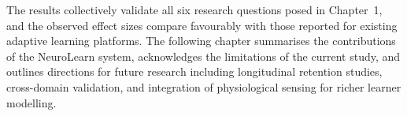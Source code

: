 The results collectively validate all six research questions posed in Chapter~1, and the observed effect sizes compare favourably with those reported for existing adaptive learning platforms. The following chapter summarises the contributions of the NeuroLearn system, acknowledges the limitations of the current study, and outlines directions for future research including longitudinal retention studies, cross-domain validation, and integration of physiological sensing for richer learner modelling.